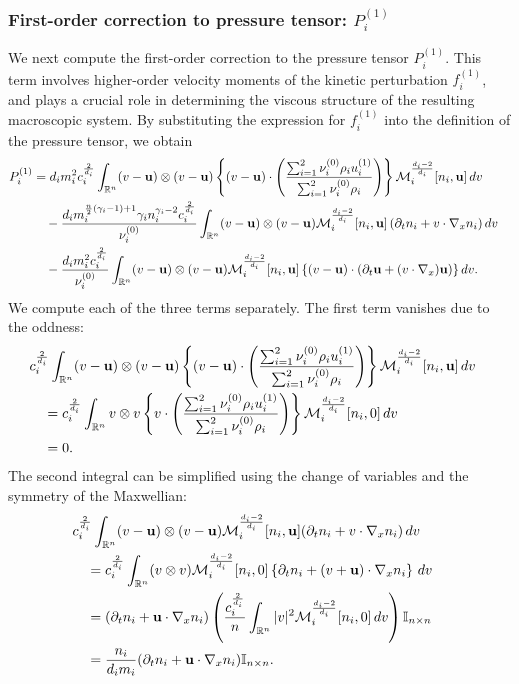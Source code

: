 \documentclass[10pt,reqno]{amsart}
\numberwithin{equation}{section}
\newcommand{\R}{\mathbb R}
\newcommand{\lt}{\left}
\newcommand{\rt}{\right}
\newcommand{\pa}{\partial}
\newcommand{\intr}{\int_{\R^n}}
\begin{document}

\subsubsection*{First-order correction to pressure tensor: $P_i^{(1)}$}
We next compute the first-order correction to the pressure tensor $P_i^{(1)}$. This term involves higher-order velocity moments of the kinetic perturbation $f_i^{(1)}$, and plays a crucial role in determining the viscous structure of the resulting macroscopic system. By substituting the expression for $f_i^{(1)}$ into the definition of the pressure tensor, we obtain
\begin{align*}
P_i^{(1)}&=d_im_i^2c_i^{\frac{2}{d_i}}\int_{\mathbb{R}^n} (v - {\bf{u}}) \otimes (v - {\bf{u}}) \left\{ (v-{\bf{u}})\cdot \left( \frac{ \sum_{i=1}^2\nu_i^{(0)} \rho_iu_i^{(1)}}{\sum_{i=1}^2\nu_i^{(0)} \rho_i} \right)\right\}\mathcal{M}_i^{\frac{d_i-2}{d_i}}[n_i,{\bf{u}}]
\,dv\cr 
&\quad -\frac{d_i m_i^{\frac n2(\gamma_i - 1) + 1} \gamma_in_i^{\gamma_i-2}c_i^{\frac{2}{d_i}}}{\nu_i^{(0)}}\intr (v-{\bf{u}})\otimes (v-{\bf{u}})   \mathcal{M}_i^{\frac{d_i-2}{d_i}}[n_i, {\bf{u}}]\left( \pa_tn_i+v\cdot \nabla_x n_i \right)  dv \cr 
&\quad -\frac{d_i m_i^2 c_i^{\frac{2}{d_i}}}{\nu_i^{(0)}}\intr (v-{\bf{u}})\otimes (v-{\bf{u}})      \mathcal{M}_i^{\frac{d_i-2}{d_i}}[n_i, {\bf{u}}] \, \{(v-{\bf{u}})\cdot \left(\pa_t {\bf{u}} + (v \cdot \nabla_x) {\bf{u}}\right)\}   \,dv.
\end{align*}
We compute each of the three terms separately. The first term vanishes due to the oddness: 
\begin{align*}
&c_i^{\frac{2}{d_i}}\int_{\mathbb{R}^n} (v - {\bf{u}}) \otimes (v - {\bf{u}}) \left\{ (v-{\bf{u}})\cdot \left( \frac{ \sum_{i=1}^2\nu_i^{(0)} \rho_iu_i^{(1)}}{\sum_{i=1}^2\nu_i^{(0)} \rho_i} \right)\right\}\mathcal{M}_i^{\frac{d_i-2}{d_i}}[n_i,{\bf{u}}]
\,dv\cr 
&\quad =c_i^{\frac{2}{d_i}}\int_{\mathbb{R}^n} v \otimes v \left\{ v\cdot \left( \frac{ \sum_{i=1}^2\nu_i^{(0)} \rho_iu_i^{(1)}}{\sum_{i=1}^2\nu_i^{(0)} \rho_i} \right)\right\}\mathcal{M}_i^{\frac{d_i-2}{d_i}}[n_i,0]
\,dv\cr 
&\quad =0.
\end{align*}
The second integral can be simplified using the change of variables and the symmetry of the Maxwellian:
\begin{align*}
&c_i^{\frac 2{d_i}} \intr (v-{\bf{u}})\otimes (v-{\bf{u}})   \mathcal{M}_i^{\frac{d_i-2}{d_i}}[n_i, {\bf{u}}]   (\pa_tn_i+v\cdot\nabla_xn_i)\,dv\cr 
&\quad =c_i^{\frac 2{d_i}} \intr (v\otimes v) \mathcal{M}_i^{\frac{d_i-2}{d_i}}[n_i, 0]  \left\{\pa_tn_i+ (v+{\bf{u}})\cdot\nabla_xn_i\right\}\,dv\cr 
&\quad =(\pa_tn_i+{\bf{u}}\cdot\nabla_xn_i) \lt(\frac{c_i^{\frac 2{d_i}}}{n}\intr |v|^2   \mathcal{M}_i^{\frac{d_i-2}{d_i}}[n_i, 0]  \,dv \rt)   \mathbb{I}_{n\times n}\cr 
&\quad =\frac{n_i}{d_i m_i}(\pa_tn_i+{\bf{u}}\cdot\nabla_x n_i) \mathbb{I}_{n\times n}.
\end{align*}
\end{document}
